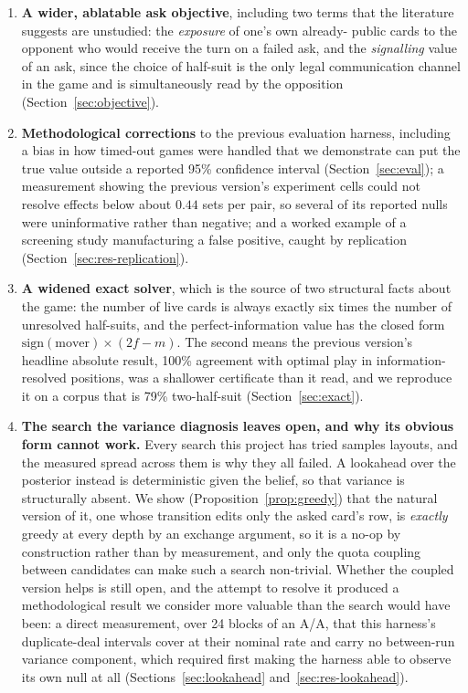 \documentclass[11pt,letterpaper]{article}
\begin{document}
\begin{enumerate}
\item \textbf{A wider, ablatable ask objective}, including two terms that the
literature suggests are unstudied: the \emph{exposure} of one's own already-
public cards to the opponent who would receive the turn on a failed ask, and
the \emph{signalling} value of an ask, since the choice of half-suit is the
only legal communication channel in the game and is simultaneously read by the
opposition (Section~\ref{sec:objective}).

\item \textbf{Methodological corrections} to the previous evaluation harness,
including a bias in how timed-out games were handled that we demonstrate can
put the true value outside a reported 95\% confidence interval
(Section~\ref{sec:eval}); a measurement showing the previous version's
experiment cells could not resolve effects below about $0.44$ sets per pair, so
several of its reported nulls were uninformative rather than negative; and a
worked example of a screening study manufacturing a false positive, caught by
replication (Section~\ref{sec:res-replication}).

\item \textbf{A widened exact solver}, which is the source of two structural
facts about the game: the number of live cards is always exactly six times the
number of unresolved half-suits, and the perfect-information value has the
closed form $\mathrm{sign}(\text{mover}) \times (2f - m)$. The second means the
previous version's headline absolute result, 100\% agreement with optimal
play in information-resolved positions, was a shallower certificate than it
read, and we reproduce it on a corpus that is 79\% two-half-suit
(Section~\ref{sec:exact}).

\item \textbf{The search the variance diagnosis leaves open, and why its obvious
form cannot work.} Every search this project has tried samples layouts, and the
measured spread across them is why they all failed. A lookahead over the
posterior instead is deterministic given the belief, so that variance is
structurally absent. We show (Proposition~\ref{prop:greedy}) that the natural
version of it, one whose transition edits only the asked card's row, is
\emph{exactly} greedy at every depth by an exchange argument, so it is a no-op by
construction rather than by measurement, and only the quota coupling between
candidates can make such a search non-trivial. Whether the coupled version helps is still
open, and the attempt to resolve it produced a methodological result we consider
more valuable than the search would have been: a direct measurement, over 24
blocks of an A/A, that this harness's duplicate-deal intervals cover at their
nominal rate and carry no between-run variance component, which required first
making the harness able to observe its own null at all
(Sections~\ref{sec:lookahead} and~\ref{sec:res-lookahead}).
\end{enumerate}
\end{document}
